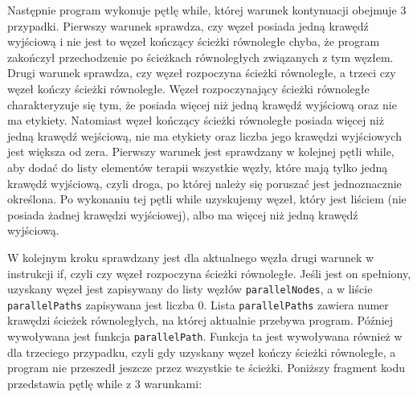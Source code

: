 Następnie program wykonuje pętlę while, której warunek kontynuacji obejmuje 3 przypadki. 
Pierwszy warunek sprawdza, czy węzeł posiada jedną krawędź wyjściową i nie jest to węzeł kończący ścieżki równoległe chyba, że program zakończył przechodzenie po ścieżkach równoległych związanych z tym węzłem. 
Drugi warunek sprawdza, czy węzeł rozpoczyna ścieżki równoległe, a trzeci czy węzeł kończy ścieżki równoległe. Węzeł rozpoczynający ścieżki równoległe charakteryzuje się tym, że posiada więcej niż jedną krawędź wyjściową oraz nie ma etykiety. Natomiast węzeł kończący ścieżki równoległe posiada więcej niż jedną krawędź wejściową, nie ma etykiety oraz liczba jego krawędzi wyjściowych jest większa od zera. 
Pierwszy warunek jest sprawdzany w kolejnej pętli while, aby dodać do listy elementów terapii wszystkie węzły, które mają tylko jedną krawędź wyjściową, czyli droga, po której należy się poruszać jest jednoznacznie określona. 
Po wykonaniu tej pętli while uzyskujemy węzeł, który jest liściem (nie posiada żadnej krawędzi wyjściowej), 
albo ma więcej niż jedną krawędź wyjściową.

W kolejnym kroku sprawdzany jest dla aktualnego węzła drugi warunek w instrukcji if, czyli czy węzeł rozpoczyna ścieżki równoległe. Jeśli jest on spełniony, uzyskany węzeł jest zapisywany do listy węzłów \texttt{parallelNodes}, 
a w liście \texttt{parallelPaths} zapisywana jest liczba 0. 
Lista \texttt{parallelPaths} zawiera numer krawędzi ścieżek równoległych, na której aktualnie przebywa program. Później wywoływana jest funkcja \texttt{parallelPath}. 
Funkcja ta jest wywoływana również w dla trzeciego przypadku, czyli gdy uzyskany węzeł kończy ścieżki równoległe, a program nie przeszedł jeszcze przez wszystkie te ścieżki. 
Poniższy fragment kodu przedstawia pętlę while z 3 warunkami:

